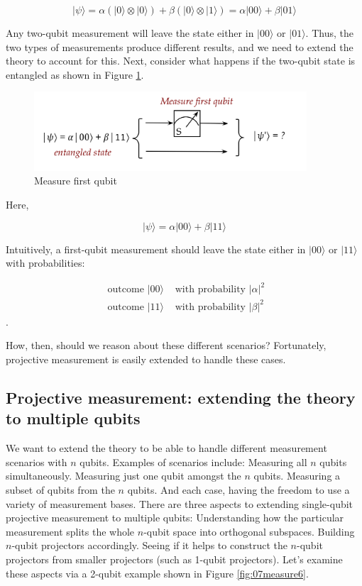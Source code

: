 \documentclass[main.tex]{subfiles}
\begin{document}
    $$
    |\psi\rangle=\alpha(|0\rangle \otimes|0\rangle)+\beta(|0\rangle \otimes|1\rangle)=\alpha|00\rangle+\beta|01\rangle
    $$
    
    Any two-qubit measurement will leave the state either in $|00\rangle$ or $|01\rangle$. Thus, the two types of measurements produce different results, and we need to extend the theory to account for this. Next, consider what happens if the two-qubit state is entangled as shown in Figure \ref{fig:06measure5}.
    
    \begin{figure}
        \centering
        \includegraphics[width=4in]{notes/figs/n07/06measure5.png}
        \caption{Measure first qubit}
        \label{fig:06measure5}
    \end{figure}
    
    Here,
    
    $$
    |\psi\rangle=\alpha|00\rangle+\beta|11\rangle
    $$
    
    Intuitively, a first-qubit measurement should leave the state either in $|00\rangle$ or $|11\rangle$ with probabilities: 
    
    $$\begin{array}{ll}\text { outcome }|00\rangle & \text { with probability }|\alpha|^{2} \\ \text { outcome }|11\rangle & \text { with probability }|\beta|^{2}\end{array}$$. 
    
    How, then, should we reason about these different scenarios? Fortunately, projective measurement is easily extended to handle these cases.
    
\subsection{Projective measurement: extending the theory to multiple qubits}

    We want to extend the theory to be able to handle different measurement scenarios with $n$ qubits. Examples of scenarios include: Measuring all $n$ qubits simultaneously. Measuring just one qubit amongst the $n$ qubits. Measuring a subset of qubits from the $n$ qubits. And each case, having the freedom to use a variety of measurement bases. There are three aspects to extending single-qubit projective measurement to multiple qubits: Understanding how the particular measurement splits the whole $n$-qubit space into orthogonal subspaces. Building $n$-qubit projectors accordingly. Seeing if it helps to construct the $n$-qubit projectors from smaller projectors (such as 1-qubit projectors). Let's examine these aspects via a 2-qubit example shown in Figure \ref{fig:07measure6}.
    
\end{document}
